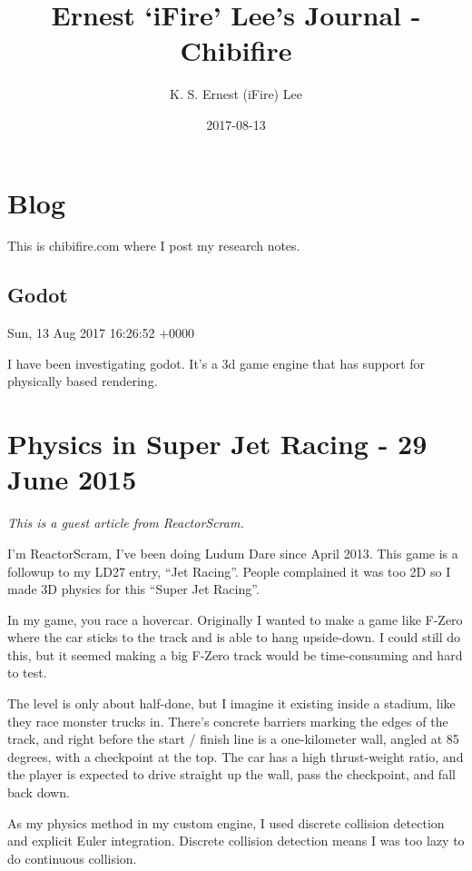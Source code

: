 \documentclass[]{book}
\title{Ernest `iFire' Lee's Journal - Chibifire}
\author{K. S. Ernest (iFire) Lee}
\date{2017-08-13}
\begin{document}
\maketitle

{
\setcounter{tocdepth}{1}
\tableofcontents
}
\chapter{Blog}\label{intro}

This is chibifire.com where I post my research notes.

\section{Godot}\label{godot}

 Sun, 13 Aug 2017 16:26:52 +0000

I have been investigating godot. It's a 3d game engine that has support
for physically based rendering.

\chapter{Physics in Super Jet Racing - 29 June
2015}\label{physics-in-super-jet-racing---29-june-2015}

\emph{This is a guest article from ReactorScram.}

I'm ReactorScram, I've been doing Ludum Dare since April 2013. This game
is a followup to my LD27 entry, ``Jet Racing''. People complained it was
too 2D so I made 3D physics for this ``Super Jet Racing''.

In my game, you race a hovercar. Originally I wanted to make a game like
F-Zero where the car sticks to the track and is able to hang
upside-down. I could still do this, but it seemed making a big F-Zero
track would be time-consuming and hard to test.

The level is only about half-done, but I imagine it existing inside a
stadium, like they race monster trucks in. There's concrete barriers
marking the edges of the track, and right before the start / finish line
is a one-kilometer wall, angled at 85 degrees, with a checkpoint at the
top. The car has a high thrust-weight ratio, and the player is expected
to drive straight up the wall, pass the checkpoint, and fall back down.

As my physics method in my custom engine, I used discrete collision
detection and explicit Euler integration. Discrete collision detection
means I was too lazy to do continuous collision.
\end{document}

